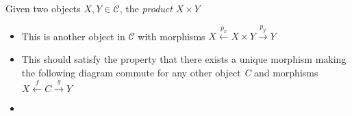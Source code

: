 Given two objects $X,Y \in \mathcal{C}$, the \emph{product} $X \times Y$

\begin{itemize}
    \item This is another object in $\mathcal{C}$ with morphisms $X \xleftarrow{p_x}X\times Y\xrightarrow{p_y}Y$
    \item This should satisfy the property that there exists a unique morphism making the following diagram commute for any other object \emph{C} and morphisms $X \xleftarrow{f}C\xrightarrow{g}Y$
    \item {}
  \end{itemize}
